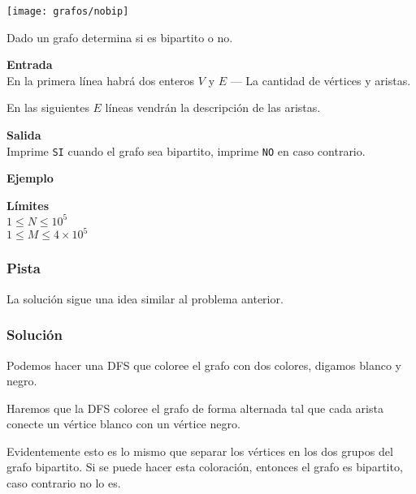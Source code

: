 \begin{center}
	\texttt{[image: grafos/nobip]}
\end{center}

Dado un grafo determina si es bipartito o no.

\textbf{Entrada}\\
En la primera línea habrá dos enteros \(V\) y \(E\) --- La cantidad de vértices y aristas.

En las siguientes \(E\) líneas vendrán la descripción de las aristas.

\textbf{Salida}\\
Imprime \verb|SI| cuando el grafo sea bipartito, imprime \verb|NO| en caso contrario.

\textbf{Ejemplo}\\
\begin{casebox2}
\end{casebox2}

\textbf{Límites}\\
\(1\leq N \leq 10^5\)\\
\(1\leq M \leq 4\times10^5\)
	

\pagebreak

\subsubsection*{Pista}
La solución sigue una idea similar al problema anterior.

\subsubsection*{Solución}
Podemos hacer una DFS que coloree el grafo con dos colores, digamos blanco y negro. 

Haremos que la DFS coloree el grafo de forma alternada tal que cada arista conecte un vértice blanco con un vértice negro. 

Evidentemente esto es lo mismo que separar los vértices en los dos grupos del grafo bipartito. Si se puede hacer esta coloración, entonces el grafo es bipartito, caso contrario no lo es.

